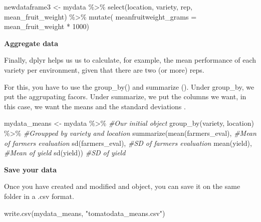 \documentclass[
]{book}
\newenvironment{Shaded}{\begin{snugshade}}{\end{snugshade}}
\newcommand{\AttributeTok}[1]{\textcolor[rgb]{0.77,0.63,0.00}{#1}}
\newcommand{\CommentTok}[1]{\textcolor[rgb]{0.56,0.35,0.01}{\textit{#1}}}
\newcommand{\DecValTok}[1]{\textcolor[rgb]{0.00,0.00,0.81}{#1}}
\newcommand{\FunctionTok}[1]{\textcolor[rgb]{0.00,0.00,0.00}{#1}}
\newcommand{\NormalTok}[1]{#1}
\newcommand{\OtherTok}[1]{\textcolor[rgb]{0.56,0.35,0.01}{#1}}
\newcommand{\SpecialCharTok}[1]{\textcolor[rgb]{0.00,0.00,0.00}{#1}}
\newcommand{\StringTok}[1]{\textcolor[rgb]{0.31,0.60,0.02}{#1}}
\begin{document}
\begin{Shaded}
\begin{Highlighting}[]
\NormalTok{newdataframe3 }\OtherTok{\textless{}{-}}\NormalTok{ mydata }\SpecialCharTok{\%\textgreater{}\%}
                 \FunctionTok{select}\NormalTok{(location, variety, rep, mean\_fruit\_weight) }\SpecialCharTok{\%\textgreater{}\%}
                 \FunctionTok{mutate}\NormalTok{( }\AttributeTok{meanfruitweight\_grams =}\NormalTok{ mean\_fruit\_weight }\SpecialCharTok{*} \DecValTok{1000}\NormalTok{)}
\end{Highlighting}
\end{Shaded}

\textbf{Aggregate data}

Finally, dplyr helps us us to calculate, for example, the mean performance of each variety per environment, given that there are two (or more) reps.

For this, you have to use the group\_by() and summarize (). Under group\_by, we put the aggrupating facors. Under summarize, we put the columns we want, in this case, we want the means and the standard deviations
.

\begin{Shaded}
\begin{Highlighting}[]
\NormalTok{mydata\_means }\OtherTok{\textless{}{-}}\NormalTok{ mydata }\SpecialCharTok{\%\textgreater{}\%}                   \CommentTok{\#Our initial object}
              \FunctionTok{group\_by}\NormalTok{(variety, location) }\SpecialCharTok{\%\textgreater{}\%}         \CommentTok{\#Groupped by variety and location}
              \FunctionTok{summarize}\NormalTok{(}\FunctionTok{mean}\NormalTok{(farmers\_eval),           }\CommentTok{\#Mean of farmer\textquotesingle{}s evaluation}
                          \FunctionTok{sd}\NormalTok{(farmers\_eval),           }\CommentTok{\#SD of farmer\textquotesingle{}s evaluation}
                          \FunctionTok{mean}\NormalTok{(yield),                }\CommentTok{\#Mean of yield}
                          \FunctionTok{sd}\NormalTok{(yield))                   }\CommentTok{\#SD of yield}
\end{Highlighting}
\end{Shaded}

\textbf{Save your data}

Once you have created and modified and object, you can save it on the same folder in a .csv format.

\begin{Shaded}
\begin{Highlighting}[]
\FunctionTok{write.csv}\NormalTok{(mydata\_means, }\StringTok{"tomatodata\_means.csv"}\NormalTok{)}
\end{Highlighting}
\end{Shaded}
\end{document}
